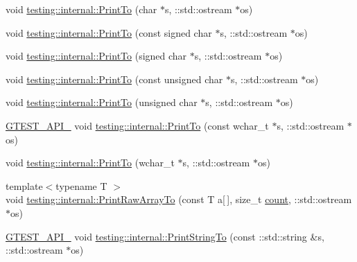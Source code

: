 \begin{DoxyCompactItemize}
void \mbox{\hyperlink{namespacetesting_1_1internal_a553eec7bb50de01c9e91cac4accc606f}{testing\+::internal\+::\+Print\+To}} (char $\ast$s, \+::std\+::ostream $\ast$os)
\item 
void \mbox{\hyperlink{namespacetesting_1_1internal_a792cc5665a34619ed7a6d54711433456}{testing\+::internal\+::\+Print\+To}} (const signed char $\ast$s, \+::std\+::ostream $\ast$os)
\item 
void \mbox{\hyperlink{namespacetesting_1_1internal_a1320096b116f8cc4b688acbd5b783051}{testing\+::internal\+::\+Print\+To}} (signed char $\ast$s, \+::std\+::ostream $\ast$os)
\item 
void \mbox{\hyperlink{namespacetesting_1_1internal_a42c591f2164ad105b502a9262333aed2}{testing\+::internal\+::\+Print\+To}} (const unsigned char $\ast$s, \+::std\+::ostream $\ast$os)
\item 
void \mbox{\hyperlink{namespacetesting_1_1internal_a7fae797c500d66d0f5a9db4f205e3416}{testing\+::internal\+::\+Print\+To}} (unsigned char $\ast$s, \+::std\+::ostream $\ast$os)
\item 
\mbox{\hyperlink{_obj__test_2lib_2googletest-release-1_88_81_2googletest_2include_2gtest_2internal_2gtest-port_8h_aa73be6f0ba4a7456180a94904ce17790}{G\+T\+E\+S\+T\+\_\+\+A\+P\+I\+\_\+}} void \mbox{\hyperlink{namespacetesting_1_1internal_afb038075e9e2166d1d9158a19e0eed23}{testing\+::internal\+::\+Print\+To}} (const wchar\+\_\+t $\ast$s, \+::std\+::ostream $\ast$os)
\item 
void \mbox{\hyperlink{namespacetesting_1_1internal_a8d41baa371fad3eb5a3dbe1bbc02c290}{testing\+::internal\+::\+Print\+To}} (wchar\+\_\+t $\ast$s, \+::std\+::ostream $\ast$os)
\item 
{\footnotesize template$<$typename T $>$ }\\void \mbox{\hyperlink{namespacetesting_1_1internal_ad3013b6b4c825edee9fe18ff1d982faa}{testing\+::internal\+::\+Print\+Raw\+Array\+To}} (const T a\mbox{[}$\,$\mbox{]}, size\+\_\+t \mbox{\hyperlink{_obj__test_2lib_2googletest-release-1_88_81_2googlemock_2test_2gmock__stress__test_8cc_afd9db40e3361ae09188795e8cbe19752}{count}}, \+::std\+::ostream $\ast$os)
\item 
\mbox{\hyperlink{_obj__test_2lib_2googletest-release-1_88_81_2googletest_2include_2gtest_2internal_2gtest-port_8h_aa73be6f0ba4a7456180a94904ce17790}{G\+T\+E\+S\+T\+\_\+\+A\+P\+I\+\_\+}} void \mbox{\hyperlink{namespacetesting_1_1internal_a8b53e46cea3f8bdfc9342057c4f6ba62}{testing\+::internal\+::\+Print\+String\+To}} (const \+::std\+::string \&s, \+::std\+::ostream $\ast$os)

\end{DoxyCompactItemize}
